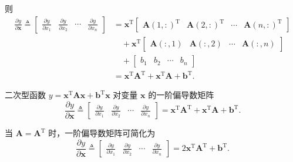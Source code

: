 则
\begin{equation*}
\begin{aligned}
\frac{\partial y}{\partial \boldsymbol{x}} \triangleq \begin{bmatrix}
\displaystyle \frac{\partial y}{\partial x_1} & \displaystyle \frac{\partial y}{\partial x_2} & \cdots & \displaystyle \frac{\partial y}{\partial x_n}
\end{bmatrix}
&= \boldsymbol{x}^{\mathrm{T}} \begin{bmatrix}
\boldsymbol{A}(1,:)^{\mathrm{T}} & \boldsymbol{A}(2,:)^{\mathrm{T}} & \cdots & \boldsymbol{A}(n,:)^{\mathrm{T}}
\end{bmatrix} \\
&\quad + \boldsymbol{x}^{\mathrm{T}} \begin{bmatrix}
\boldsymbol{A}(:,1) & \boldsymbol{A}(:,2) & \cdots & \boldsymbol{A}(:,n)
\end{bmatrix} \\
&\quad + \begin{bmatrix}
b_1 & b_2 & \cdots & b_n
\end{bmatrix} \\
&= \boldsymbol{x}^{\mathrm{T}} \boldsymbol{A}^{\mathrm{T}} + \boldsymbol{x}^{\mathrm{T}} \boldsymbol{A} + \boldsymbol{b}^{\mathrm{T}}.
\end{aligned}
\end{equation*}

二次型函数 $y = \boldsymbol{x}^{\mathrm{T}} \boldsymbol{A} \boldsymbol{x} + \boldsymbol{b}^{\mathrm{T}} \boldsymbol{x}$ 对变量 $\boldsymbol{x}$ 的一阶偏导数矩阵
\begin{equation*}
\boxed{\frac{\partial y}{\partial \boldsymbol{x}} \triangleq \begin{bmatrix}
\displaystyle \frac{\partial y}{\partial x_1} & \displaystyle \frac{\partial y}{\partial x_2} & \cdots & \displaystyle \frac{\partial y}{\partial x_n}
\end{bmatrix} = \boldsymbol{x}^{\mathrm{T}} \boldsymbol{A}^{\mathrm{T}} + \boldsymbol{x}^{\mathrm{T}} \boldsymbol{A} + \boldsymbol{b}^{\mathrm{T}}}.
\end{equation*}

当 $\boldsymbol{A} = \boldsymbol{A}^{\mathrm{T}}$ 时，一阶偏导数矩阵可简化为
\begin{equation*}
\frac{\partial y}{\partial \boldsymbol{x}} \triangleq \begin{bmatrix}
\displaystyle \frac{\partial y}{\partial x_1} & \displaystyle \frac{\partial y}{\partial x_2} & \cdots & \displaystyle \frac{\partial y}{\partial x_n}
\end{bmatrix} = 2 \boldsymbol{x}^{\mathrm{T}} \boldsymbol{A}^{\mathrm{T}} + \boldsymbol{b}^{\mathrm{T}}.
\end{equation*}


